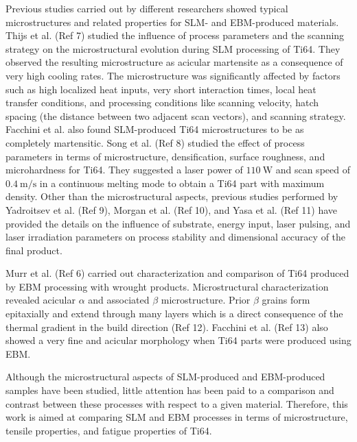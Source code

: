 \documentclass[10pt]{article}
\begin{document}
Previous studies carried out by different researchers showed typical microstructures and related properties for SLM- and EBM-produced materials. Thijs et al. (Ref 7) studied the influence of process parameters and the scanning strategy on the microstructural evolution during SLM processing of Ti64. They observed the resulting microstructure as acicular martensite as a consequence of very high cooling rates. The microstructure was significantly affected by factors such as high localized heat inputs, very short interaction times, local heat transfer conditions, and processing conditions like scanning velocity, hatch spacing (the distance between two adjacent scan vectors), and scanning strategy. Facchini et al. also found SLM-produced Ti64 microstructures to be as completely martensitic. Song et al. (Ref 8) studied the effect of process parameters in terms of microstructure, densification, surface roughness, and microhardness for Ti64. They suggested a laser power of $110 \mathrm{~W}$ and scan speed of $0.4 \mathrm{~m} / \mathrm{s}$ in a continuous melting mode to obtain a Ti64 part with maximum density. Other than the microstructural aspects, previous studies performed by Yadroitsev et al. (Ref 9), Morgan et al. (Ref 10), and Yasa et al. (Ref 11) have provided the details on the influence of substrate, energy input, laser pulsing, and laser irradiation parameters on process stability and dimensional accuracy of the final product.

Murr et al. (Ref 6) carried out characterization and comparison of Ti64 produced by EBM processing with wrought products. Microstructural characterization revealed acicular $\alpha$ and associated $\beta$ microstructure. Prior $\beta$ grains form epitaxially and extend through many layers which is a direct consequence of the thermal gradient in the build direction (Ref 12). Facchini et al. (Ref 13) also showed a very fine and acicular morphology when Ti64 parts were produced using EBM.

Although the microstructural aspects of SLM-produced and EBM-produced samples have been studied, little attention has been paid to a comparison and contrast between these processes with respect to a given material. Therefore, this work is aimed at comparing SLM and EBM processes in terms of microstructure, tensile properties, and fatigue properties of Ti64.
\end{document}

